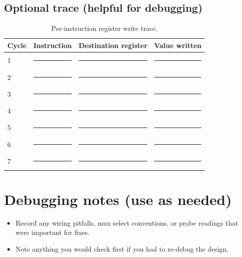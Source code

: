 \documentclass[11pt]{article}
\newcommand{\fillin}{\rule{2.5em}{0.4pt}}
\begin{document}
\subsection*{Optional trace (helpful for debugging)}
\begin{table}[h]
  \centering
  \caption{Per-instruction register write trace.}
  \begin{tabular}{llll}
    \toprule
    Cycle & Instruction & Destination register & Value written \\
    \midrule
    1 & \fillin & \fillin & \fillin \\
    2 & \fillin & \fillin & \fillin \\
    3 & \fillin & \fillin & \fillin \\
    4 & \fillin & \fillin & \fillin \\
    5 & \fillin & \fillin & \fillin \\
    6 & \fillin & \fillin & \fillin \\
    7 & \fillin & \fillin & \fillin \\
    \bottomrule
  \end{tabular}
\end{table}

\section*{Debugging notes (use as needed)}
\begin{itemize}[leftmargin=*]
  \item Record any wiring pitfalls, mux select conventions, or probe readings that were important for fixes.
  \item Note anything you would check first if you had to re-debug the design.
\end{itemize}
\end{document}
